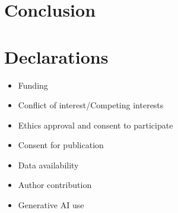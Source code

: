 \documentclass[pdflatex,sn-mathphys-num]{sn-jnl}
\begin{document}
\section{Conclusion}\label{sec:conclusion}

\backmatter


\section*{Declarations}

\begin{itemize}
\item Funding
\item Conflict of interest/Competing interests
\item Ethics approval and consent to participate
\item Consent for publication
\item Data availability
\item Author contribution
\item Generative AI use
\end{itemize}

\begin{appendices}

\section{}\label{app:1}

\subsection{}\label{app:1.1}

\end{appendices}
\end{document}
